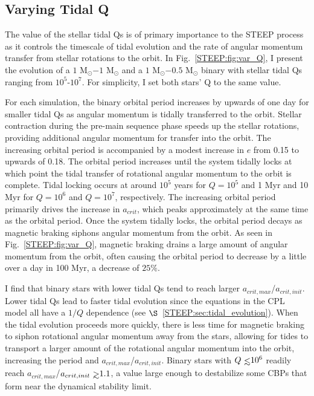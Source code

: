 \subsection{Varying Tidal Q} \label{STEEP:sec:var_Q}

The value of the stellar tidal Qs is of primary importance to the STEEP process as it controls the timescale of tidal evolution and the rate of angular momentum transfer from stellar rotations to the orbit.  In Fig.~\ref{STEEP:fig:var_Q}, I present the evolution of a $1$ M$_{\odot}$$-1$ M$_{\odot}$ and a $1$ M$_{\odot}$$-0.5$ M$_{\odot}$ binary with stellar tidal Qs ranging from $10^5$-$10^7$.  For simplicity, I set both stars' Q to the same value.  

For each simulation, the binary orbital period increases by upwards of one day for smaller tidal Qs as angular momentum is tidally transferred to the orbit.  Stellar contraction during the pre-main sequence phase speeds up the stellar rotations, providing additional angular momentum for transfer into the orbit.  The increasing orbital period is accompanied by a modest increase in $e$ from 0.15 to upwards of 0.18.  The orbital period increases until the system tidally locks at which point the tidal transfer of rotational angular momentum to the orbit is complete.  Tidal locking occurs at around $10^5$ years for $Q=10^5$ and 1 Myr and 10 Myr for $Q=10^6$ and $Q=10^7$, respectively.  The increasing orbital period primarily drives the increase in $a_{crit}$, which peaks approximately at the same time as the orbital period.  Once the system tidally locks, the orbital period decays as magnetic braking siphons angular momentum from the orbit.  As seen in Fig.~\ref{STEEP:fig:var_Q}, magnetic braking drains a large amount of angular momentum from the orbit, often causing the orbital period to decrease by a little over a day in 100 Myr, a decrease of $25\%$.

I find that binary stars with lower tidal Qs tend to reach larger $a_{crit,max}$/$a_{crit,init}$.  Lower tidal Qs lead to faster tidal evolution since the equations in the CPL model all have a $1/Q$ dependence (see $\S$~\ref{STEEP:sec:tidal_evolution}).  When the tidal evolution proceeds more quickly, there is less time for magnetic braking to siphon rotational angular momentum away from the stars, allowing for tides to transport a larger amount of the rotational angular momentum into the orbit, increasing the period and $a_{crit,max}$/$a_{crit,init}$.  Binary stars with $Q \lsim 10^6$ readily reach $a_{crit,max}$/$a_{crit,init} \gsim 1.1$, a value large enough to destabilize some CBPs that form near the dynamical stability limit.

